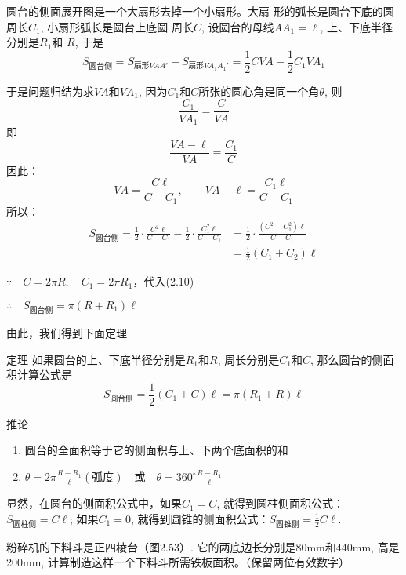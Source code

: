 圆台的侧面展开图是一个大扇形去掉一个小扇形。大扇
形的弧长是圆台下底的圆周长$C_1$, 小扇形弧长是圆台上底圆
周长$C$, 设圆台的母线$AA_1=\ell$, 上、下底半径分别是$R_1$和
$R$, 于是
\[S_{\text{圆台侧}}=S_{\text{扇形}VAA'}-S_{\text{扇形}VA_1A_1'}=\frac{1}{2}CVA-\frac{1}{2}C_1VA_1\]

于是问题归结为求$VA$和$VA_1$, 因为$C_1$和$C$所张的圆心角是同一个角$\theta$, 则
\[\frac{C_1}{VA_1}=\frac{C}{VA}\]
即
\[\frac{VA-\ell}{VA}=\frac{C_1}{C}\]
因此：
\begin{equation}
VA=\frac{C\ell}{C-C_1},\qquad VA-\ell=\frac{C_1\ell}{C-C_1}    
\end{equation}
所以：
\begin{equation}
    \begin{split}
S_{\text{圆台侧}}=\frac{1}{2}\cdot\frac{C^2\ell}{C-C_1}-\frac{1}{2}\cdot \frac{C^2_1\ell}{C-C_1}&=\frac{1}{2}\cdot\frac{(C^2-C^2_1)\ell}{C-C_1}\\
&=\frac{1}{2}(C_1+C_2)\ell        
    \end{split}
\end{equation}

$\because\quad C=2\pi R,\quad  C_1=2\pi R_1$，代入(2.10)

$\therefore\quad S_{\text{圆台侧}}=\pi(R+R_1)\ell$

由此，我们得到下面定理

\begin{blk}
    {定理} 如果圆台的上、下底半径分别是$R_1$和$R$, 周长分别是$C_1$和$C$, 那么圆台的侧面积计算公式是
\[S_{\text{圆台侧}}=\frac{1}{2}(C_1+C)\ell=\pi(R_1+R)\ell \]
\end{blk}

\begin{blk}{推论}
\begin{enumerate}
    \item 圆台的全面积等于它的侧面积与上、下两个底面积的和
    \item $\theta=2\pi\frac{R-R_1}{\ell}(\text{弧度})\quad \text{或}\quad \theta=360^{\circ}\frac{R-R_1}{\ell}$
\end{enumerate}
显然，在圆台的侧面积公式中，如果$C_1=C$, 就得到圆柱侧面积公式：$S_{\text{圆柱侧}}=C\ell$; 如果$C_1=0$, 就得到圆锥的侧面积公式：$S_{\text{圆锥侧}}=\frac{1}{2}C\ell$.
\end{blk}



\begin{example}
粉碎机的下料斗是正四棱台（图2.53）. 它的两底边长分别是80mm和440mm, 高是200mm, 计算制造这样一个下料斗所需铁板面积。（保留两位有效数字）
\end{example}


